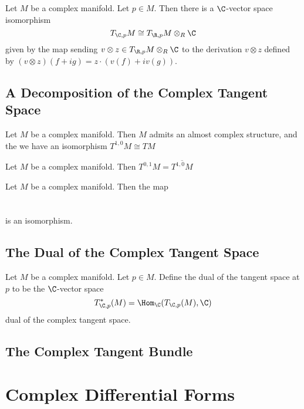 \documentclass[a4paper]{article}
\begin{document}
\begin{prp}{}{} Let $M$ be a complex manifold. Let $p\in M$. Then there is a $\C$-vector space isomorphism $$T_{\C,p}M\cong T_{\R,p}M\otimes_R\C$$ given by the map sending $v\otimes z\in T_{\R,p}M\otimes_R\C$ to the derivation $v\otimes z$ defined by $(v\otimes z)(f+ig)=z\cdot(v(f)+iv(g))$. 
\end{prp}

\subsection{A Decomposition of the Complex Tangent Space}

\begin{prp}{}{} Let $M$ be a complex manifold. Then $M$ admits an almost complex structure, and the we have an isomorphism $T^{1,0}M\cong TM$
\end{prp}

\begin{prp}{}{} Let $M$ be a complex manifold. Then $T^{0,1}M=\overline{T^{1,0}M}$
\end{prp}

\begin{lmm}{}{} Let $M$ be a complex manifold. Then the map \\~\\
 \\
is an isomorphism. 
\end{lmm}

\subsection{The Dual of the Complex Tangent Space}
\begin{defn}{}{} Let $M$ be a complex manifold. Let $p\in M$. Define the dual of the tangent space at $p$ to be the $\C$-vector space $$T_{\C,p}^\ast(M)=\Hom_\C(T_{\C,p}(M),\C)$$ dual of the complex tangent space. 
\end{defn}

\subsection{The Complex Tangent Bundle}

\pagebreak
\section{Complex Differential Forms}
\end{document}
